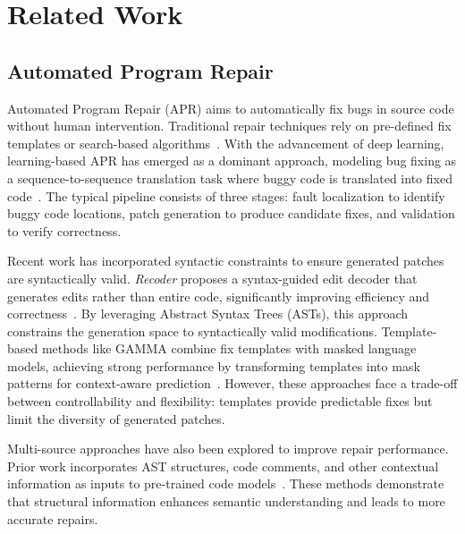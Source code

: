 \chapter{Related Work}
\begingroup
\justifying
\setlength{\parindent}{0pt}
\setlength{\parskip}{0.5\baselineskip}
\titlespacing{\chapter}{0pt}{0pt}{0pt}
\titlespacing{\section}{0pt}{0pt}{0pt}

\section{Automated Program Repair}

Automated Program Repair (APR) aims to automatically fix bugs in source code without human intervention. Traditional repair techniques rely on pre-defined fix templates or search-based algorithms~\cite{zhang2023surveylearningbasedautomatedprogram}. With the advancement of deep learning, learning-based APR has emerged as a dominant approach, modeling bug fixing as a sequence-to-sequence translation task where buggy code is translated into fixed code~\cite{zhang2023surveylearningbasedautomatedprogram}. The typical pipeline consists of three stages: fault localization to identify buggy code locations, patch generation to produce candidate fixes, and validation to verify correctness.

Recent work has incorporated syntactic constraints to ensure generated patches are syntactically valid. \textit{Recoder} proposes a syntax-guided edit decoder that generates edits rather than entire code, significantly improving efficiency and correctness~\cite{zhu2022syntaxguidededitdecoderneural}. By leveraging Abstract Syntax Trees (ASTs), this approach constrains the generation space to syntactically valid modifications. Template-based methods like GAMMA combine fix templates with masked language models, achieving strong performance by transforming templates into mask patterns for context-aware prediction~\cite{zhang2023gammarevisitingtemplatebasedautomated}. However, these approaches face a trade-off between controllability and flexibility: templates provide predictable fixes but limit the diversity of generated patches.

Multi-source approaches have also been explored to improve repair performance. Prior work incorporates AST structures, code comments, and other contextual information as inputs to pre-trained code models~\cite{paul2023enhancingautomatedprogramrepair}. These methods demonstrate that structural information enhances semantic understanding and leads to more accurate repairs.

